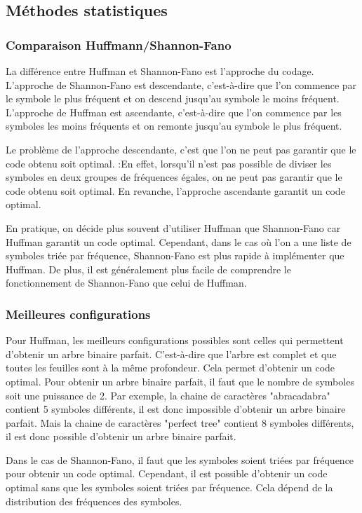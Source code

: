 \subsection{Méthodes statistiques}

    \subsubsection{Comparaison Huffmann/Shannon-Fano}

    La différence entre Huffman et Shannon-Fano est l'approche du codage. L'approche de Shannon-Fano est descendante, c'est-à-dire que l'on commence par le symbole le plus fréquent et on descend jusqu'au symbole le moins fréquent. L'approche de Huffman est ascendante, c'est-à-dire que l'on commence par les symboles les moins fréquents et on remonte jusqu'au symbole le plus fréquent.

    \medskip

    Le problème de l'approche descendante, c'est que l'on ne peut pas garantir que le code obtenu soit optimal. :En effet, lorsqu'il n'est pas possible de diviser les symboles en deux groupes de fréquences égales, on ne peut pas garantir que le code obtenu soit optimal. En revanche, l'approche ascendante garantit un code optimal.

    \medskip

    En pratique, on décide plus souvent d'utiliser Huffman que Shannon-Fano car Huffman garantit un code optimal. Cependant, dans le cas où l'on a une liste de symboles triée par fréquence, Shannon-Fano est plus rapide à implémenter que Huffman. De plus, il est généralement plus facile de comprendre le fonctionnement de Shannon-Fano que celui de Huffman.

    \subsubsection{Meilleures configurations}

    Pour Huffman, les meilleurs configurations possibles sont celles qui permettent d'obtenir un arbre binaire parfait. C'est-à-dire que l'arbre est complet et que toutes les feuilles sont à la même profondeur. Cela permet d'obtenir un code optimal. Pour obtenir un arbre binaire parfait, il faut que le nombre de symboles soit une puissance de 2. Par exemple, la chaine de caractères "abracadabra" contient 5 symboles différents, il est donc impossible d'obtenir un arbre binaire parfait. Mais la chaine de caractères "perfect tree" contient 8 symboles différents, il est donc possible d'obtenir un arbre binaire parfait.

    Dans le cas de Shannon-Fano, il faut que les symboles soient triées par fréquence pour obtenir un code optimal. Cependant, il est possible d'obtenir un code optimal sans que les symboles soient triées par fréquence. Cela dépend de la distribution des fréquences des symboles.